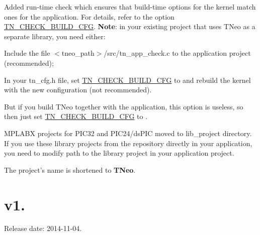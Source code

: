 \begin{DoxyItemize}
\item Added run-\/time check which ensures that build-\/time options for the kernel match ones for the application. For details, refer to the option {\ttfamily \hyperlink{tn__cfg__default_8h_aacdc913eb66492cf69cf02a5de73578e}{T\+N\+\_\+\+C\+H\+E\+C\+K\+\_\+\+B\+U\+I\+L\+D\+\_\+\+C\+F\+G}}. {\bfseries Note}\+: in your existing project that uses T\+Neo as a separate library, you need either\+:
\begin{DoxyItemize}
\item Include the file {\ttfamily $<$tneo\+\_\+path$>$/src/tn\+\_\+app\+\_\+check.c} to the application project (recommended);
\item In your {\ttfamily tn\+\_\+cfg.\+h} file, set {\ttfamily \hyperlink{tn__cfg__default_8h_aacdc913eb66492cf69cf02a5de73578e}{T\+N\+\_\+\+C\+H\+E\+C\+K\+\_\+\+B\+U\+I\+L\+D\+\_\+\+C\+F\+G}} to {} and rebuild the kernel with the new configuration (not recommended).
\end{DoxyItemize}

But if you build T\+Neo together with the application, this option is useless, so then just set {\ttfamily \hyperlink{tn__cfg__default_8h_aacdc913eb66492cf69cf02a5de73578e}{T\+N\+\_\+\+C\+H\+E\+C\+K\+\_\+\+B\+U\+I\+L\+D\+\_\+\+C\+F\+G}} to {}.
\item M\+P\+L\+A\+B\+X projects for P\+I\+C32 and P\+I\+C24/ds\+P\+I\+C moved to {\ttfamily lib\+\_\+project} directory. If you use these library projects from the repository directly in your application, you need to modify path to the library project in your application project.
\item The project's name is shortened to {\bfseries T\+Neo}.
\end{DoxyItemize}\hypertarget{changelog_changelog_v1_04}{}\section{v1.}\label{changelog_changelog_v1_04}
Release date\+: 2014-\/11-\/04.


